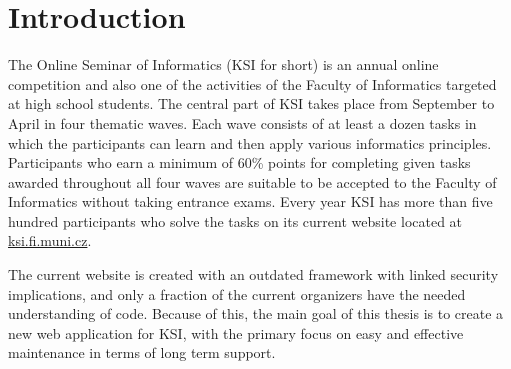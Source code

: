\documentclass[
  digital, %
  oneside, %
  lof,     %
  nolot,     %
]{fithesis4}
\begin{document}
\clearpage
\printnoidxglossary[title={Abbreviations}, type=\acronymtype]
\printnoidxglossary[title={Glossary}]

\chapter*{Introduction}

\mdstart

The Online Seminar of Informatics (KSI for short) is an annual online competition and also one of the activities of the Faculty of Informatics targeted at high school students. The central part of KSI takes place from September to April in four thematic waves. Each wave consists of at least a dozen tasks in which the participants can learn and then apply various informatics principles. Participants who earn a minimum of 60\% points for completing given tasks awarded throughout all four waves are suitable to be accepted to the Faculty of Informatics without taking entrance exams. Every year KSI has more than five hundred participants who solve the tasks on its current website located at \href{https://ksi.fi.muni.cz}{ksi.fi.muni.cz}.

The current website is created with an outdated framework with linked security implications, and only a fraction of the current organizers have the needed understanding of code. Because of this, the main goal of this thesis is to create a new web application for KSI, with the primary focus on easy and effective maintenance in terms of long term support.
\end{document}
